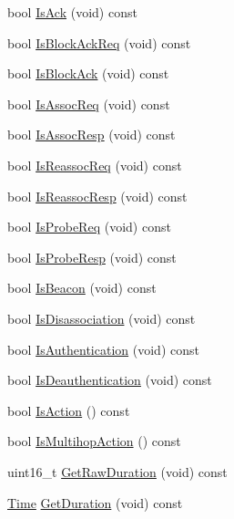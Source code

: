 \begin{DoxyCompactItemize}
\item 
bool \hyperlink{classns3_1_1WifiMacHeader_a414485c0ee780ddedecb338a11bb54ce}{Is\+Ack} (void) const 
\item 
bool \hyperlink{classns3_1_1WifiMacHeader_a44f012384009b131d21512459c727f02}{Is\+Block\+Ack\+Req} (void) const 
\item 
bool \hyperlink{classns3_1_1WifiMacHeader_a273fb5273dcb6c690ac66a7caf72d305}{Is\+Block\+Ack} (void) const 
\item 
bool \hyperlink{classns3_1_1WifiMacHeader_a0cb964299c2d74d5a959531628c98299}{Is\+Assoc\+Req} (void) const 
\item 
bool \hyperlink{classns3_1_1WifiMacHeader_a67c4f554332deb9120ba4c1b7034fb81}{Is\+Assoc\+Resp} (void) const 
\item 
bool \hyperlink{classns3_1_1WifiMacHeader_aff57db6eb05bbcd017bddaec480d4593}{Is\+Reassoc\+Req} (void) const 
\item 
bool \hyperlink{classns3_1_1WifiMacHeader_a58f45f31867ee1fd730c1e8a5d9e1331}{Is\+Reassoc\+Resp} (void) const 
\item 
bool \hyperlink{classns3_1_1WifiMacHeader_a580dc9fb4e9d8b2e6eda6b9af750f071}{Is\+Probe\+Req} (void) const 
\item 
bool \hyperlink{classns3_1_1WifiMacHeader_a0062d4c967c83bf09817b510bbfba4c8}{Is\+Probe\+Resp} (void) const 
\item 
bool \hyperlink{classns3_1_1WifiMacHeader_a96c4c9ea3caf8999f2c052a5afcd0565}{Is\+Beacon} (void) const 
\item 
bool \hyperlink{classns3_1_1WifiMacHeader_a316dd26d1e35a18dba90462f2e8c8c90}{Is\+Disassociation} (void) const 
\item 
bool \hyperlink{classns3_1_1WifiMacHeader_a15b3a1ad0f69aae053e95bdeb6cc722a}{Is\+Authentication} (void) const 
\item 
bool \hyperlink{classns3_1_1WifiMacHeader_a0d1e5bef3b5a309abd97d9b902466540}{Is\+Deauthentication} (void) const 
\item 
bool \hyperlink{classns3_1_1WifiMacHeader_a4f0f1dc289f21d3840bd782ff309d33a}{Is\+Action} () const 
\item 
bool \hyperlink{classns3_1_1WifiMacHeader_ace9f797923cb4c52ec7f18aad8ad57ea}{Is\+Multihop\+Action} () const 
\item 
uint16\+\_\+t \hyperlink{classns3_1_1WifiMacHeader_af53b04d513b27228533d9772e38a917a}{Get\+Raw\+Duration} (void) const 
\item 
\hyperlink{classns3_1_1Time}{Time} \hyperlink{classns3_1_1WifiMacHeader_a8f571e232811efd517427de8efa7daab}{Get\+Duration} (void) const 

\end{DoxyCompactItemize}
